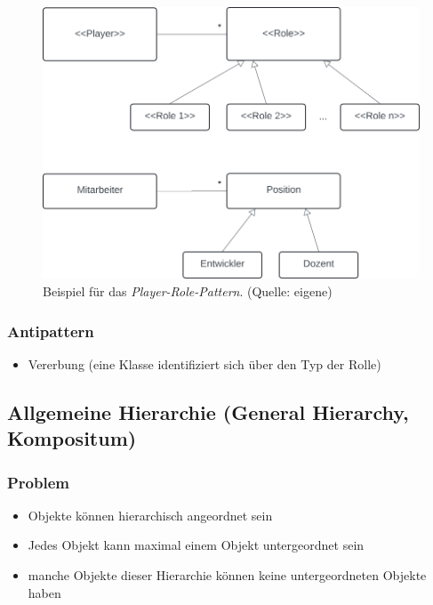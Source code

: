 \begin{figure}
    \centering
    \includegraphics[scale=0.4]{part two/Objektorientierte Analyse/img/playerrole}
    \caption{Beispiel für das \textit{Player-Role-Pattern}. (Quelle: eigene)}
    \label{fig:playerrole}
\end{figure}


\subsubsection*{Antipattern}
\begin{itemize}
    \item Vererbung (eine Klasse identifiziert sich über den Typ der Rolle)
\end{itemize}


\subsection{Allgemeine Hierarchie (General Hierarchy, Kompositum)}

\subsubsection*{Problem}
\begin{itemize}
    \item Objekte können hierarchisch angeordnet sein
    \item Jedes Objekt kann maximal einem Objekt untergeordnet sein
    \item manche Objekte dieser Hierarchie können keine untergeordneten Objekte haben
\end{itemize}

